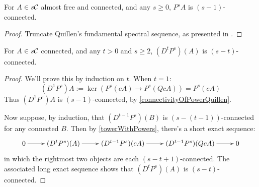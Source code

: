 \documentclass[10pt]{article}
\newcommand{\Comm}{\calC}
\begin{document}
\begin{convergenceOLD}
\begin{prop}\label{connectivityOfPowerQuillen}
For $A\in s\Comm$ almost free and connected, and any $s\geq0$, $P^{s}A$ is $(s-1)$-connected.
\end{prop}
\begin{proof}
Truncate Quillen's fundamental spectral sequence, as presented in \cite[thm 6.2]{MR1089001}.
\end{proof}
\begin{cor}\label{connectivityOfDerivedPowers}
For $A\in s\Comm$ connected, and any $t>0$ and $s\geq2$, $(D^tP^{s})(A)$ is $(s-t)$-connected.
\end{cor}
\begin{proof}
We'll prove this by induction on $t$. When $t=1$:
\[(D^1P^{s})A:=\ker(P^{s}(cA)\to P^{s}(QcA))=P^{s}(cA)\]
Thus $(D^1P^{s})A$ is $(s-1)$-connected, by \ref{connectivityOfPowerQuillen}.

Now suppose, by induction, that $(D^{t-1}P^{s})(B)$ is $(s-(t-1))$-connected for any connected $B$. Then by \ref{towerWithPowers}, there's a short exact sequence:
\[\xymatrix{
0\ar[r]&
(D^{t}P^{s})(A)\ar[r]&
(D^{t-1}P^{s})(cA)\ar[r]&
(D^{t-1}P^{s})(QcA)\ar[r]&
0
}\]
in which the rightmost two objects are each $(s-t+1)$-connected. The associated long exact sequence shows that $(D^{t}P^{s})(A)$ is $(s-t)$-connected.
\end{proof}




\end{convergenceOLD}
\end{document}
